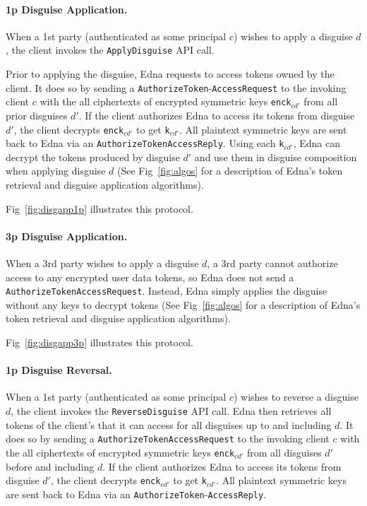 \paragraph{1p Disguise Application.}
When a 1st party (authenticated as some principal $c$) wishes to apply a disguise $d$, the
client invokes the \texttt{ApplyDisguise} API call. 

Prior to applying the disguise, Edna requests to access tokens owned by the client. It does so by
sending a \texttt{AuthorizeToken}-\texttt{AccessRequest} to the invoking client $c$ with the all ciphertexts of 
encrypted symmetric keys \texttt{enck}$_{cd'}$ from all prior disguises $d'$. If the client
authorizes Edna to access its tokens from disguise $d'$, the client decrypts \texttt{enck}$_{cd'}$
to get \texttt{k}$_{cd'}$. All plaintext symmetric keys are sent back to Edna via an
\texttt{AuthorizeTokenAccessReply}. 
Using each \texttt{k}$_{cd'}$, Edna can decrypt the tokens produced by disguise $d'$ and use them
in disguise composition when applying disguise $d$ (See Fig~\ref{fig:algos} for a description of Edna's
token retrieval and disguise application algorithms).

Fig~\ref{fig:disgapp1p} illustrates this protocol.

\paragraph{3p Disguise Application.}
When a 3rd party wishes to apply a disguise $d$, a 3rd party cannot authorize access to any encrypted user data tokens, so Edna does not
send a \texttt{AuthorizeToken}\texttt{AccessRequest}. Instead, Edna simply applies the disguise  
without any keys to decrypt tokens (See Fig~\ref{fig:algos} for a description of Edna's
token retrieval and disguise application algorithms).

Fig~\ref{fig:disgapp3p} illustrates this protocol.

\paragraph{1p Disguise Reversal.}
When a 1st party (authenticated as some principal $c$) wishes to reverse a disguise $d$, the client
invokes the \texttt{ReverseDisguise} API call. Edna then retrieves all tokens of the client's that
it can access for all disguises up to and including $d$. It does so by sending a
\texttt{AuthorizeToken}\texttt{AccessRequest} to the invoking client $c$ with the all ciphertexts of
encrypted symmetric keys \texttt{enck}$_{cd'}$ from all disguises $d'$ before and including $d$. If
the client authorizes Edna to access its tokens from disguise $d'$, the client decrypts
\texttt{enck}$_{cd'}$ to get \texttt{k}$_{cd'}$. All plaintext symmetric keys are sent back to Edna
via an \texttt{AuthorizeToken}-\texttt{AccessReply}. 

